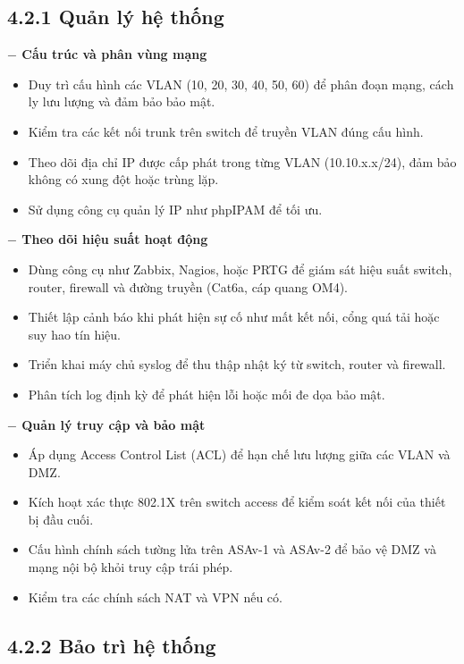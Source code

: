 \subsection*{4.2.1 Quản lý hệ thống}

\textbf{ $-$ Cấu trúc và phân vùng mạng}

\begin{itemize}[left = 2cm]
    \item Duy trì cấu hình các VLAN (10, 20, 30, 40, 50, 60) để phân đoạn mạng, cách ly lưu lượng và đảm bảo bảo mật.
    \item Kiểm tra các kết nối trunk trên switch để truyền VLAN đúng cấu hình.
    \item Theo dõi địa chỉ IP được cấp phát trong từng VLAN (10.10.x.x/24), đảm bảo không có xung đột hoặc trùng lặp.
    \item Sử dụng công cụ quản lý IP như phpIPAM để tối ưu.
\end{itemize}

\textbf{$-$ Theo dõi hiệu suất hoạt động}
\begin{itemize}[left = 2cm]
    \item Dùng công cụ như Zabbix, Nagios, hoặc PRTG để giám sát hiệu suất switch, router, firewall và đường truyền (Cat6a, cáp quang OM4).
    \item Thiết lập cảnh báo khi phát hiện sự cố như mất kết nối, cổng quá tải hoặc suy hao tín hiệu.
    \item Triển khai máy chủ syslog để thu thập nhật ký từ switch, router và firewall.
    \item Phân tích log định kỳ để phát hiện lỗi hoặc mối đe dọa bảo mật.
\end{itemize}

\textbf{$-$ Quản lý truy cập và bảo mật}
\begin{itemize}[left = 2cm]
    \item Áp dụng Access Control List (ACL) để hạn chế lưu lượng giữa các VLAN và DMZ.
    \item Kích hoạt xác thực 802.1X trên switch access để kiểm soát kết nối của thiết bị đầu cuối.
    \item Cấu hình chính sách tường lửa trên ASAv-1 và ASAv-2 để bảo vệ DMZ và mạng nội bộ khỏi truy cập trái phép.
    \item Kiểm tra các chính sách NAT và VPN nếu có.
\end{itemize}

\subsection*{4.2.2 Bảo trì hệ thống}

